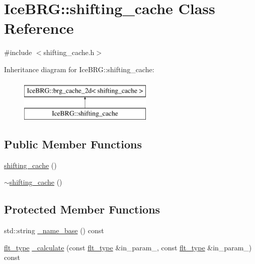 \hypertarget{classIceBRG_1_1shifting__cache}{}\section{Ice\+B\+R\+G\+:\+:shifting\+\_\+cache Class Reference}
\label{classIceBRG_1_1shifting__cache}


{\ttfamily \#include $<$shifting\+\_\+cache.\+h$>$}

Inheritance diagram for Ice\+B\+R\+G\+:\+:shifting\+\_\+cache\+:\begin{figure}[H]
\begin{center}
\leavevmode
\includegraphics[height=2.000000cm]{classIceBRG_1_1shifting__cache}
\end{center}
\end{figure}
\subsection*{Public Member Functions}
\begin{DoxyCompactItemize}
\item 
\hyperlink{classIceBRG_1_1shifting__cache_a92a3afff41a2a906a84ae92e646e2d54}{shifting\+\_\+cache} ()
\item 
\hyperlink{classIceBRG_1_1shifting__cache_a79341fd1ec6588a16c669259b319b74c}{$\sim$shifting\+\_\+cache} ()
\end{DoxyCompactItemize}
\subsection*{Protected Member Functions}
\begin{DoxyCompactItemize}
\item 
std\+::string \hyperlink{classIceBRG_1_1shifting__cache_a6b8e62883a72521632375c7e98ddc6c2}{\+\_\+name\+\_\+base} () const 
\item 
\hyperlink{lib_2IceBRG__main_2common_8h_ad0f130a56eeb944d9ef2692ee881ecc4}{flt\+\_\+type} \hyperlink{classIceBRG_1_1shifting__cache_a5e61b8f959110a8efdc74ab34f268444}{\+\_\+calculate} (const \hyperlink{lib_2IceBRG__main_2common_8h_ad0f130a56eeb944d9ef2692ee881ecc4}{flt\+\_\+type} \&in\+\_\+param\+\_, const \hyperlink{lib_2IceBRG__main_2common_8h_ad0f130a56eeb944d9ef2692ee881ecc4}{flt\+\_\+type} \&in\+\_\+param\+\_) const 
\end{DoxyCompactItemize}

